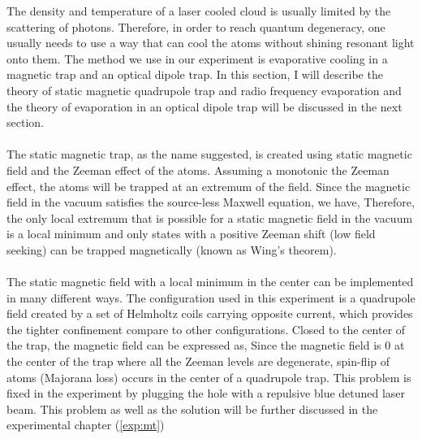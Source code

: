 The density and temperature of a laser cooled cloud is usually limited by the scattering of photons. Therefore, in order to reach quantum degeneracy, one usually needs to use a way that can cool the atoms without shining resonant light onto them. The method we use in our experiment is evaporative cooling in a magnetic trap and an optical dipole trap. In this section, I will describe the theory of static magnetic quadrupole trap and radio frequency evaporation and the theory of evaporation in an optical dipole trap will be discussed in the next section.\\
\\
The static magnetic trap, as the name suggested, is created using static magnetic field and the Zeeman effect of the atoms. Assuming a monotonic the Zeeman effect, the atoms will be trapped at an extremum of the field. Since the magnetic field in the vacuum satisfies the source-less Maxwell equation, we have,
Therefore, the only local extremum that is possible for a static magnetic field in the vacuum is a local minimum and only states with a positive Zeeman shift (low field seeking) can be trapped magnetically (known as Wing's theorem\cite{wing-theorem}).\\
\\
The static magnetic field with a local minimum in the center can be implemented in many different ways. The configuration used in this experiment is a quadrupole field created by a set of Helmholtz coils carrying opposite current, which provides the tighter confinement compare to other configurations. Closed to the center of the trap, the magnetic field can be expressed as,
Since the magnetic field is $0$ at the center of the trap where all the Zeeman levels are degenerate, spin-flip of atoms (Majorana loss) occurs in the center of a quadrupole trap. This problem is fixed in the experiment by plugging the hole with a repulsive blue detuned laser beam. This problem as well as the solution will be further discussed in the experimental chapter (\ref{exp:mt})\\
